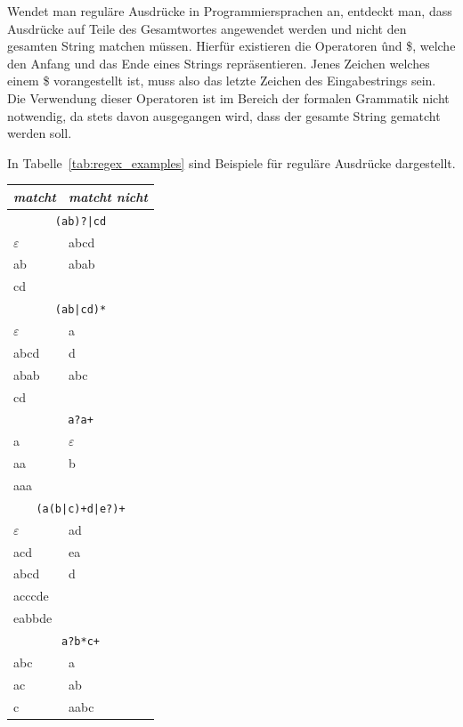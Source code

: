Wendet man reguläre Ausdrücke in Programmiersprachen an, entdeckt man, dass Ausdrücke auf Teile des Gesamtwortes angewendet werden und nicht den gesamten String matchen müssen. Hierfür existieren die Operatoren \^ und \$, welche den Anfang und das Ende eines Strings repräsentieren. Jenes Zeichen welches einem \$ vorangestellt ist, muss also das letzte Zeichen des Eingabestrings sein. Die Verwendung dieser Operatoren ist im Bereich der formalen Grammatik nicht notwendig, da stets davon ausgegangen wird, dass der gesamte String gematcht werden soll.

In Tabelle~\ref{tab:regex_examples} sind Beispiele für reguläre Ausdrücke dargestellt.
%
\begin{table}[p]
 \begin{center}
  \begin{tabular}{ll}
    \hline \hline
      \emph{matcht} & \emph{matcht nicht} \\
    \hline \hline
      \multicolumn{2}{c}{\texttt{(ab)?|cd}} \\
    \hline
      $\varepsilon$ & abcd \\
      ab & abab \\
      cd & \\
    \hline
      \multicolumn{2}{c}{\texttt{(ab|cd)*}} \\
    \hline
      $\varepsilon$ & a \\
      abcd & d \\
      abab & abc \\
      cd & \\
    \hline
      \multicolumn{2}{c}{\texttt{a?a+}} \\
    \hline
      a & $\varepsilon$ \\
      aa & b \\
      aaa & \\
    \hline
      \multicolumn{2}{c}{\texttt{(a(b|c)+d|e?)+}} \\
    \hline
      $\varepsilon$ & ad \\
      acd & ea \\
      abcd & d \\
      acccde & \\
      eabbde & \\
    \hline
      \multicolumn{2}{c}{\texttt{a?b*c+}} \\
    \hline
      abc & a \\
      ac & ab \\
      c & aabc \\

\end{tabular}
\end{center}
\end{table}
